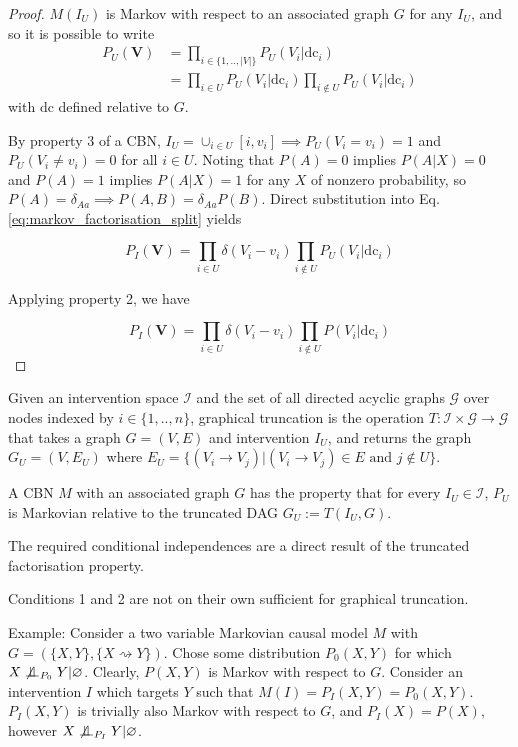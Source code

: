 \begin{proof}
$M(I_U)$ is Markov with respect to an associated graph $G$ for any $I_U$, and so it is possible to write
\begin{align}
    P_U(\mathbf{V})  &=  \prod_{i\in\{1,..,|V|\}} P_U(V_i|\mathrm{dc}_i) \nonumber \\
    &=  \prod_{i\in U} P_U(V_i|\mathrm{dc}_i) \prod_{i\not \in U} P_U(V_i|\mathrm{dc}_i) \label{eq:markov_factorisation_split}
\end{align}
with $\mathrm{dc}$ defined relative to $G$.

By property 3 of a CBN, $I_U =\cup_{i\in U}[i,v_i] \implies P_U(V_i=v_i)=1$ and $P_U(V_i\neq v_i)=0$ for all $i\in U$. Noting that $P(A)=0$ implies $P(A|X)=0$ and $P(A)=1$ implies $P(A|X)=1$ for any $X$ of nonzero probability, so $P(A)=\delta_{Aa}\implies P(A,B)=\delta_{Aa}P(B)$. Direct substitution into Eq. \ref{eq:markov_factorisation_split} yields

\[P_I(\mathbf{V}) = \prod_{i\in U} \delta(V_i-v_i)\prod_{i\not\in U} P_U(V_i|\mathrm{dc}_i) \]

Applying property 2, we have

\[P_I(\mathbf{V}) = \prod_{i\in U} \delta(V_i-v_i)\prod_{i\not\in U} P(V_i|\mathrm{dc}_i) \]

\end{proof}

\begin{definition}
Given an intervention space $\mathcal{I}$ and the set of all directed acyclic graphs $\mathcal{G}$ over nodes indexed by $i\in\{1,..,n\}$, graphical truncation is the operation $T:\mathcal{I}\times\mathcal{G}\to\mathcal{G}$ that takes a graph $G=(V,E)$ and intervention $I_U$, and returns the graph $G_U=(V,E_U)$ where $E_U=\{(V_i\to V_j)|(V_i\to V_j)\in E\text{ and }j\not\in U\}$.
\end{definition}

\begin{corollary}
A CBN $M$ with an associated graph $G$ has the property that for every $I_U\in\mathcal{I}$, $P_U$ is Markovian relative to the truncated DAG $G_U:=T(I_U,G)$.
\end{corollary}

The required conditional independences are a direct result of the truncated factorisation property.

\begin{remark}
Conditions 1 and 2 are not on their own sufficient for graphical truncation.

Example: Consider a two variable Markovian causal model $M$ with $G=(\{X,Y\},\{X\rightsquigarrow Y\})$. Chose some distribution $P_0(X,Y)$ for which $X\not\CI_{P_0} Y| \varnothing$. Clearly, $P(X,Y)$ is Markov with respect to $G$. Consider an intervention $I$ which targets $Y$ such that $M(I)=P_I(X,Y)=P_0(X,Y)$. $P_I(X,Y)$ is trivially also Markov with respect to $G$, and $P_I(X)=P(X)$, however $X\not\CI_{P_I} Y| \varnothing$.
\end{remark}

